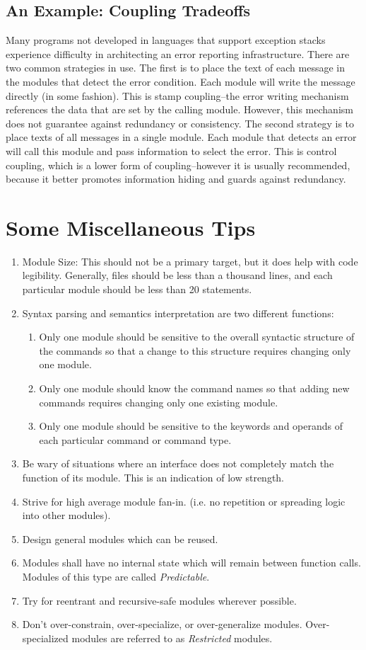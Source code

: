 \documentclass[format.tex]{subfiles}
\begin{document}
\subsection{An Example: Coupling Tradeoffs}
Many programs not developed in languages that support exception stacks
experience difficulty in architecting an error reporting infrastructure. There
are two common strategies in use. The first is to place the text of each
message in the modules that detect the error condition. Each module will write
the message directly (in some fashion). This is stamp coupling--the error
writing mechanism references the data that are set by the calling module.
However, this mechanism does not guarantee against redundancy or consistency.
The second strategy is to place texts of all messages in a single module. Each
module that detects an error will call this module and pass information to
select the error. This is control coupling, which is a lower form of
coupling--however it is usually recommended, because it better promotes
information hiding and guards against redundancy.

\section{Some Miscellaneous Tips}
\begin{enumerate}
\item Module Size: This should not be a primary target, but it does help with
  code legibility. Generally, files should be less than a thousand lines, and
  each particular module should be less than 20 statements.
\item Syntax parsing and semantics interpretation are two different functions:
  \begin{enumerate}
  \item Only one module should be sensitive to the overall syntactic structure
    of the commands so that a change to this structure requires changing only
    one module.
  \item Only one module should know the command names so that adding new
    commands requires changing only one existing module.
  \item Only one module should be sensitive to the keywords and operands of
    each particular command or command type.
  \end{enumerate}
\item Be wary of situations where an interface does not completely match the
  function of its module. This is an indication of low strength.
\item Strive for high average module fan-in. (i.e. no repetition or spreading
  logic into other modules).
\item Design general modules which can be reused.
\item Modules shall have no internal state which will remain between function
  calls. Modules of this type are called {\it Predictable}.
\item Try for reentrant and recursive-safe modules wherever possible.
\item Don't over-constrain, over-specialize, or over-generalize modules.
  Over-specialized modules are referred to as {\it Restricted} modules.
\end{enumerate}
\end{document}
